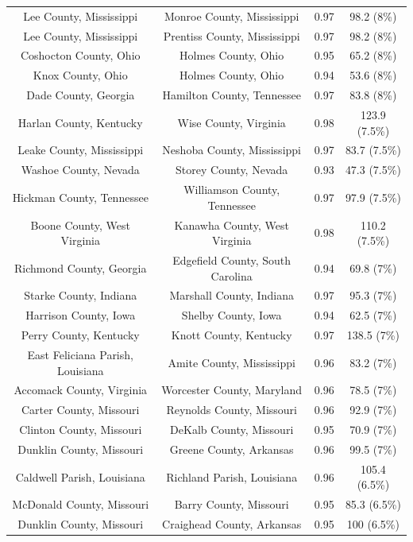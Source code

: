 \begin{longtable}{cccc}
  Lee County, Mississippi & Monroe County, Mississippi & 0.97 & 98.2 (8\%) \\ 
  Lee County, Mississippi & Prentiss County, Mississippi & 0.97 & 98.2 (8\%) \\ 
  Coshocton County, Ohio & Holmes County, Ohio & 0.95 & 65.2 (8\%) \\ 
  Knox County, Ohio & Holmes County, Ohio & 0.94 & 53.6 (8\%) \\ 
  Dade County, Georgia & Hamilton County, Tennessee & 0.97 & 83.8 (8\%) \\ 
  Harlan County, Kentucky & Wise County, Virginia & 0.98 & 123.9 (7.5\%) \\ 
  Leake County, Mississippi & Neshoba County, Mississippi & 0.97 & 83.7 (7.5\%) \\ 
  Washoe County, Nevada & Storey County, Nevada & 0.93 & 47.3 (7.5\%) \\ 
  Hickman County, Tennessee & Williamson County, Tennessee & 0.97 & 97.9 (7.5\%) \\ 
  Boone County, West Virginia & Kanawha County, West Virginia & 0.98 & 110.2 (7.5\%) \\ 
  Richmond County, Georgia & Edgefield County, South Carolina & 0.94 & 69.8 (7\%) \\ 
  Starke County, Indiana & Marshall County, Indiana & 0.97 & 95.3 (7\%) \\ 
  Harrison County, Iowa & Shelby County, Iowa & 0.94 & 62.5 (7\%) \\ 
  Perry County, Kentucky & Knott County, Kentucky & 0.97 & 138.5 (7\%) \\ 
  East Feliciana Parish, Louisiana & Amite County, Mississippi & 0.96 & 83.2 (7\%) \\ 
  Accomack County, Virginia & Worcester County, Maryland & 0.96 & 78.5 (7\%) \\ 
  Carter County, Missouri & Reynolds County, Missouri & 0.96 & 92.9 (7\%) \\ 
  Clinton County, Missouri & DeKalb County, Missouri & 0.95 & 70.9 (7\%) \\ 
  Dunklin County, Missouri & Greene County, Arkansas & 0.96 & 99.5 (7\%) \\ 
  Caldwell Parish, Louisiana & Richland Parish, Louisiana & 0.96 & 105.4 (6.5\%) \\ 
  McDonald County, Missouri & Barry County, Missouri & 0.95 & 85.3 (6.5\%) \\ 
  Dunklin County, Missouri & Craighead County, Arkansas & 0.95 & 100 (6.5\%) \\ 

\end{longtable}
